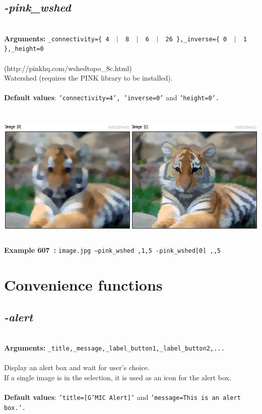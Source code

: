 \documentclass[a4paper,11pt,twoside]{book}
\begin{document}
\subsection{\emph{-pink\_wshed} }\vspace*{-0.5em}
~\\\textbf{Arguments: } 
{\small \texttt{\_connectivity=\{ 4 ~$|$~ 8 ~$|$~ 6 ~$|$~ 26 \},\_inverse=\{ 0 ~$|$~ 1 \},\_height=0}}\\~\\
(http://pinkhq.com/wshedtopo\_8c.html)
~\\Watershed (requires the PINK library to be installed).
~\\~\\\textbf{Default values}: {\small \texttt{'connectivity=4', 'inverse=0'} and \texttt{'height=0'.}}
\begin{center}\includegraphics[keepaspectratio=true,height=7cm,width=\textwidth]{img/gmic_def607.jpg}\\
{\footnotesize \textbf{Example 607~:} \texttt{image.jpg --pink\_wshed ,1,5 -pink\_wshed[0] ,,5}}
\end{center}
\section{Convenience functions}


\subsection{\emph{-alert} }\vspace*{-0.5em}
~\\\textbf{Arguments: } 
{\small \texttt{\_title,\_message,\_label\_button1,\_label\_button2,...}}\\~\\
Display an alert box and wait for user's choice.
~\\If a single image is in the selection, it is used as an icon for the alert box.
~\\~\\\textbf{Default values}: {\small \texttt{'title=[G'MIC Alert]'} and \texttt{'message=This is an alert box.'.}}
\end{document}
